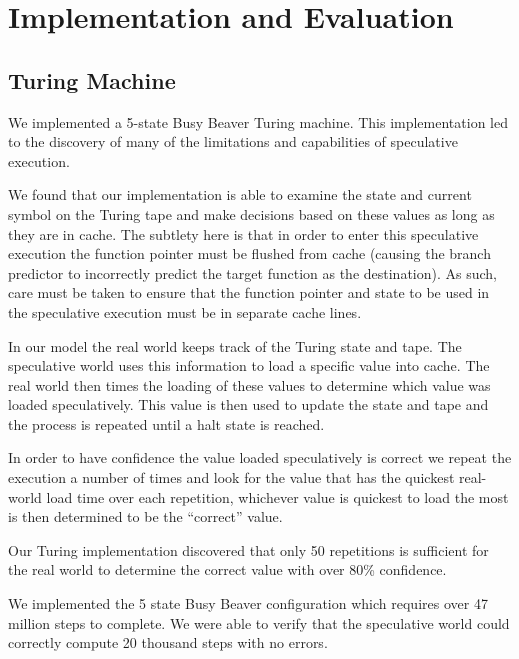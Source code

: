 
\section{Implementation and Evaluation}

\subsection{Turing Machine}
\label{subsec:impl-turing}

We implemented a 5-state Busy Beaver Turing machine.
This implementation led to the discovery of many of the limitations and
capabilities of speculative execution.

We found that our implementation is able to examine the state and current symbol
on the Turing tape and make decisions based on these values as long as they are
in cache. The subtlety here is that in order to enter this speculative execution
the function pointer must be flushed from cache (causing the branch predictor to
incorrectly predict the target function as the destination). As such, care must
be taken to ensure that the function pointer and state to be used in the
speculative execution must be in separate cache lines. 

In our model the real world keeps track of the Turing state and tape. The
speculative world uses this information to load a specific value into cache. The
real world then times the loading of these values to determine which value was
loaded speculatively. This value is then used to update the state and tape and
the process is repeated until a halt state is reached.

In order to have confidence the value loaded speculatively is correct we repeat
the execution a number of times and look for the value that has the quickest
real-world load time over each repetition, whichever value is quickest to load
the most is then determined to be the ``correct'' value.

Our Turing implementation discovered that only 50 repetitions is sufficient for
the real world to determine the correct value with over 80\% confidence.

We implemented the 5 state Busy Beaver configuration which requires over 47
million steps to complete. We were able to verify that the speculative world
could correctly compute 20 thousand steps with no errors.


